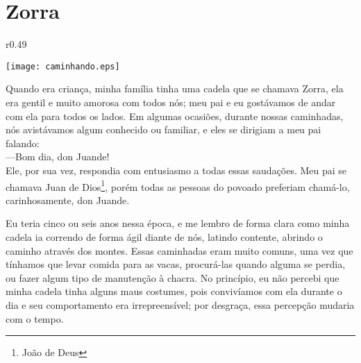 \cleardoublepage
\newpage
\ifdefined\EnableIncludeImages
\fi
\chapter{Zorra}


\ifdefined\EnableIncludeImages
\begin{wrapfigure}{r}{0.49\textwidth}
  \begin{center}
  \vspace{-30pt}
    \texttt{[image: caminhando.eps]}
  \end{center}
  \vspace{-20pt}
\end{wrapfigure}
\fi
Quando era criança, minha família tinha uma cadela que se chamava Zorra, ela era gentil e muito amorosa com todos nós; meu pai e eu gostávamos de andar com ela para todos os lados. Em algumas ocasiões, durante nossas caminhadas, nós avistávamos algum conhecido ou familiar, e eles se dirigiam a meu pai falando:\\\indent 
---Bom dia, don Juande!\\\indent
Ele, por sua vez, respondia com entusiasmo a todas essas saudações. 
Meu pai se chamava Juan de Dios\footnote{João de Deus}, porém todas as pessoas do povoado preferiam chamá-lo, carinhosamente, don Juande.

Eu teria cinco ou seis anos nessa época, e me lembro de forma clara como minha cadela ia correndo de forma ágil diante de nós, latindo contente, abrindo o caminho através dos montes.
Essas caminhadas eram muito comuns, uma vez que tínhamos que levar comida para as vacas, procurá-las quando alguma se perdia, ou fazer algum tipo de manutenção à chacra.
No princípio, eu não percebi que minha cadela tinha alguns maus costumes, 
pois convivíamos com ela durante o dia e seu comportamento era irrepreensível; 
por desgraça, essa percepção mudaria com o tempo. 

